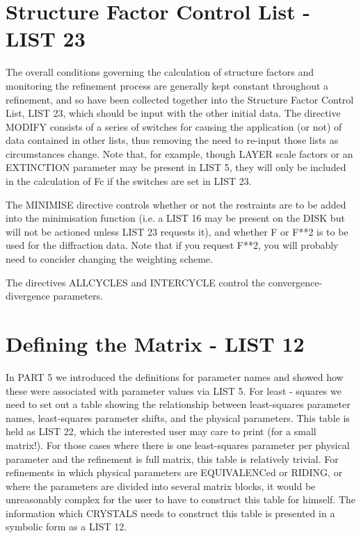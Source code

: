 \documentclass[10pt,a4paper]{report}
\begin{document}
 
\section{Structure Factor Control List - LIST 23 }


The overall conditions governing the calculation of structure factors
 and monitoring the refinement process are generally kept constant throughout
 a refinement, and so have been collected together into the Structure
 Factor Control List, LIST 23, which should be input with the other initial
 data. The directive MODIFY consists of a series of switches for causing the
 application (or not) of data contained in other lists, thus removing the
 need to re-input those lists as circumstances change. Note that, for example,
 though LAYER scale factors or an EXTINCTION parameter may be present
 in LIST 5, they will only be included in the calculation of Fc if the switches
 are set in LIST 23.


The MINIMISE directive controls whether or not the restraints are to be
 added into the minimisation function (i.e. a LIST 16 may be present on
 the DISK but will not be actioned unless LIST 23 requests it), and whether
 F or F**2 is to be used for the diffraction data. Note that if you request
 F**2, you will probably need to concider changing the weighting scheme.


The directives ALLCYCLES and INTERCYCLE control the convergence-divergence
 parameters.
\section{Defining the Matrix - LIST 12}


In PART 5 we introduced the definitions for parameter names and showed
 how these were associated with parameter values via LIST 5.  For least -
 squares we need to set out a table showing the relationship between
 least-squares parameter names, least-squares parameter shifts, and 
 the physical parameters. This table is held as LIST 22, which the 
 interested user may care to print (for a small matrix!). For those
 cases where there is one least-squares parameter per physical parameter
 and the refinement is full matrix, this table is relatively trivial. For
 refinements in which physical parameters are EQUIVALENCed or RIDING,
 or where the parameters are divided into several matrix blocks, it
 would be unreasonably complex for the user to have to construct this table for
 himself. The information which CRYSTALS needs to construct this table is
 presented in a symbolic form as a LIST 12.
\end{document}
